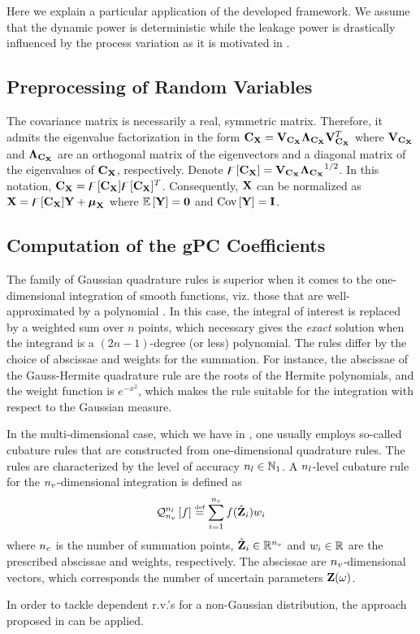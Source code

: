 Here we explain a particular application of the developed framework. We assume that the dynamic power is deterministic while the leakage power is drastically influenced by the process variation as it is motivated in .

\subsection{Preprocessing of Random Variables} 
The covariance matrix is necessarily a real, symmetric matrix. Therefore, it admits the eigenvalue factorization \cite{press2007} in the form $\mCov_\mrv{X} = \m{V}_{\mCov_\mrv{X}} \m{\Lambda}_{\mCov_\mrv{X}} \m{V}_{\mCov_\mrv{X}}^T$ where $\m{V}_{\mCov_\mrv{X}}$ and $\m{\Lambda}_{\mCov_\mrv{X}}$ are an orthogonal matrix of the eigenvectors and a diagonal matrix of the eigenvalues of $\mCov_\mrv{X}$, respectively. Denote $\oEigen{\mCov_\mrv{X}} = \m{V}_{\mCov_\mrv{X}} {\m{\Lambda}_{\mCov_\mrv{X}}}^\ifrac{1}{2}$. In this notation, $\mCov_\mrv{X} = \oEigen{\mCov_\mrv{X}} \oEigen{\mCov_\mrv{X}}^T$. Consequently, $\mrv{X}$ can be normalized as $\mrv{X} = \oEigen{\mCov_\mrv{X}} \mrv{y} + \vExp_\mrv{X}$ where $\oExp{\mrv{y}} = \mZero$ and $\oCov{\mrv{y}} = \mI$.

\subsection{Computation of the gPC Coefficients} 
The family of Gaussian quadrature rules is superior when it comes to the one-dimensional integration of smooth functions, viz. those that are well-approximated by a polynomial \cite{press2007}. In this case, the integral of interest is replaced by a weighted sum over $n$ points, which necessary gives the \emph{exact} solution when the integrand is a $(2n - 1)$-degree (or less) polynomial. The rules differ by the choice of abscissae and weights for the summation. For instance, the abscissae of the Gauss-Hermite quadrature rule are the roots of the Hermite polynomials, and the weight function is $e^{-x^2}$, which makes the rule suitable for the integration with respect to the Gaussian measure.

In the multi-dimensional case, which we have in , one usually employs so-called cubature rules that are constructed from one-dimensional quadrature rules. The rules are characterized by the level of accuracy ${n_l} \in \mathbb{N}_{1}$. A ${n_l}$-level cubature rule for the ${n_v}$-dimensional integration is defined as
\[
  \mathcal{Q}_{{n_v}}^{{n_l}}\left[f\right] \stackrel{\text{\tiny def}}{=} \sum_{i = 1}^{{n_c}} f(\hat{\mathbf{Z}}_i) w_i
\]
where ${n_c}$ is the number of summation points, $\hat{\mathbf{Z}}_i \in \mathbb{R}^{n_v}$ and $w_i \in \mathbb{R}$ are the prescribed abscissae and weights, respectively. The abscissae are ${n_v}$-dimensional vectors, which corresponds the number of uncertain parameters $\mathbf{Z}(\omega)$.

In order to tackle dependent r.v.'s for a non-Gaussian distribution, the approach proposed in \cite{babuska2010} can be applied.
